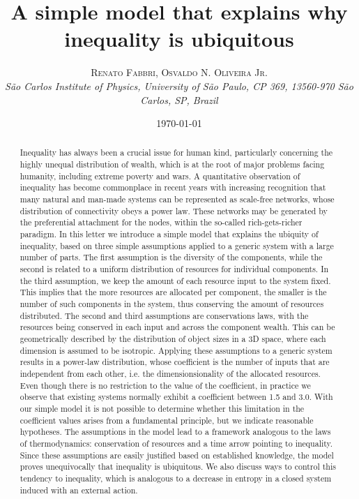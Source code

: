 \documentclass[a4paper, 11pt]{article} %
\title{\textbf{A simple model that explains why inequality is ubiquitous}\\ %
} %
\author{\textsc{Renato Fabbri, Osvaldo N. Oliveira Jr.} %
\\{\textit{São Carlos Institute of Physics, University of São Paulo, CP 369, 13560-970 São Carlos, SP, Brazil}}} %
\date{\today} %
\makeatletter
\renewcommand{\maketitle}{ %
\begin{flushright} %
{\LARGE\@title} %

\vspace{5pt} %

{\large\@author} %
\\\@date %

\vspace{1pt} %
\end{flushright}
}
\makeatother
\begin{document}
\maketitle %



%
\begin{abstract}
	Inequality has always been a crucial issue for human kind, particularly concerning the highly unequal distribution of wealth, which is at the root of major problems facing humanity, including extreme poverty and wars. A quantitative observation of inequality has become commonplace in recent years 	with increasing recognition that many natural and man-made systems can be represented as scale-free networks, whose distribution of connectivity obeys a power law. These networks may be generated by the preferential attachment for the nodes, within the so-called rich-gets-richer paradigm.	In this letter we introduce a simple model that explains the ubiquity of inequality, based on three simple assumptions applied to a generic system with a large number of parts.
The first assumption is the diversity of the components, while the second is related to a uniform distribution of resources for individual components. In the third assumption, we keep the amount of each resource input to the system fixed. This implies that the more resources are allocated per component, the smaller is the number of such components in the system, thus conserving the amount of resources distributed. The second and third assumptions are conservations laws, with the resources being conserved in each input and across the component wealth. This can be geometrically described by the distribution of object sizes in a 3D space, where each dimension is assumed to be isotropic. Applying these assumptions to a generic system results in a power-law distribution, whose coefficient is the number of inputs that are independent from each other, i.e. the dimensionsionality of the allocated resources. Even though there is no restriction to the value of the coefficient,
in practice we observe that existing systems normally exhibit a coefficient between 1.5 and 3.0. With our simple model it is not possible to determine whether this limitation in the coefficient values arises from a fundamental principle, but we indicate reasonable hypotheses.
The assumptions in the model lead to a framework analogous to the laws of thermodynamics: conservation of resources and a time arrow pointing to inequality. Since these assumptions are easily justified based on established knowledge,	the model proves unequivocally that inequality is ubiquitous. We also discuss ways to control this tendency to inequality,
which is analogous to a decrease in entropy in a closed system induced with an external action.
\end{abstract}
\end{document}
